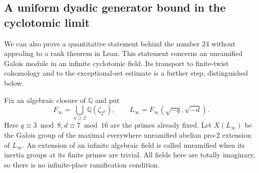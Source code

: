 \subsection{A uniform dyadic generator bound in the cyclotomic limit}
\label{sec:sr-dyadic-generators}
We can also prove a quantitative statement behind the number 24 without
appealing to a rank theorem in Lean.
This statement concerns an unramified Galois module in an infinite
cyclotomic field. Its transport to finite-twist cohomology and to the
exceptional-set estimate is a further step, distinguished below.

Fix an algebraic closure of \(\mathbb Q\) and put
\[
 F_\infty=\bigcup_{n\geq2}\mathbb Q(\zeta_{2^n}),\qquad
 L_\infty=F_\infty(\sqrt{-q},\sqrt{-d}).
\]
Here \(q\equiv3\bmod8,d\equiv7\bmod16\) are the primes already fixed.
Let \(X(L_\infty)\) be the Galois group of the maximal everywhere
unramified abelian pro-\(2\) extension of \(L_\infty\).
An extension of an infinite algebraic field is called unramified
when its inertia groups at its finite primes are trivial.
All fields here are totally imaginary, so there is no infinite-place
ramification condition.


